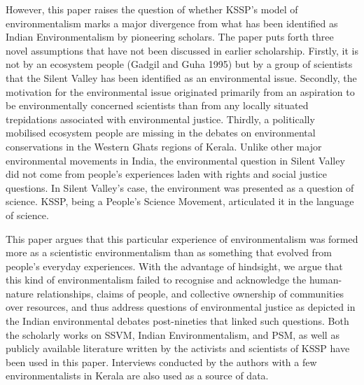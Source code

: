\documentclass[twoside, 13pt]{article}
\begin{document}
{\fontsize{12}{14}\selectfont However, this paper raises the question of whether KSSP’s model of environmentalism marks a major divergence from what has been identified as Indian Environmentalism by pioneering scholars. The paper puts forth three novel assumptions that have not been discussed in earlier scholarship. Firstly, it is not by an ecosystem people (Gadgil and Guha 1995) but by a group of scientists that the Silent Valley has been identified as an environmental issue. Secondly, the motivation for the environmental issue originated primarily from an aspiration to be environmentally concerned scientists than from any locally situated trepidations associated with environmental justice. Thirdly, a politically mobilised ecosystem people are missing in the debates on environmental conservations in the Western Ghats regions of Kerala. Unlike other major environmental movements in India, the environmental question in Silent Valley did not come from people’s experiences laden with rights and social justice questions. In Silent Valley’s case, the environment was presented as a question of science. KSSP, being a People’s Science Movement, articulated it in the language of science.}


{\fontsize{12}{14}\selectfont This paper argues that this particular experience of environmentalism was formed more as a scientistic environmentalism than as something that evolved from people’s everyday experiences. With the advantage of hindsight, we argue that this kind of environmentalism failed to recognise and acknowledge the human-nature relationships, claims of people, and collective ownership of communities over resources, and thus address questions of environmental justice as depicted in the Indian environmental debates post-nineties that linked such questions. Both the scholarly works on SSVM, Indian Environmentalism, and PSM, as well as publicly available literature written by the activists and scientists of KSSP have been used in this paper. Interviews conducted by the authors with a few environmentalists in Kerala are also used as a source of data.}
\end{document}

